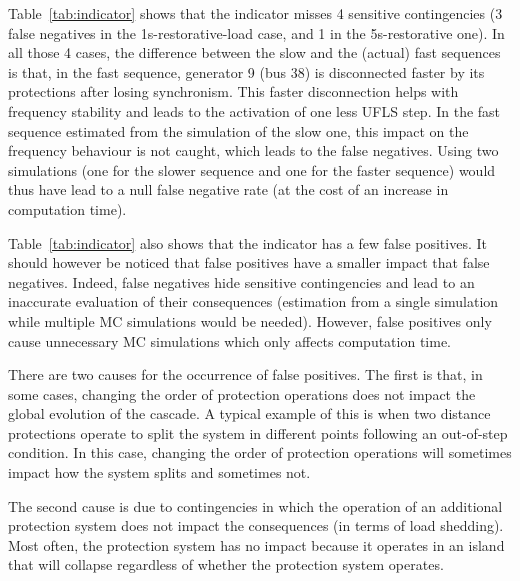 

Table~\ref{tab:indicator} shows that the indicator misses 4 sensitive contingencies (3 false negatives in the 1s-restorative-load case, and 1 in the 5s-restorative one). In all those 4 cases, the difference between the slow and the (actual) fast sequences is that, in the fast sequence, generator 9 (bus 38) is disconnected faster by its protections after losing synchronism. This faster disconnection helps with frequency stability and leads to the activation of one less UFLS step. In the fast sequence estimated from the simulation of the slow one, this impact on the frequency behaviour is not caught, which leads to the false negatives. Using two simulations (one for the slower sequence and one for the faster sequence) would thus have lead to a null false negative rate (at the cost of an increase in computation time).

Table~\ref{tab:indicator} also shows that the indicator has a few false positives. It should however be noticed that false positives have a smaller impact that false negatives. Indeed, false negatives hide sensitive contingencies and lead to an inaccurate evaluation of their consequences (estimation from a single simulation while multiple MC simulations would be needed). However, false positives only cause unnecessary MC simulations which only affects computation time.

There are two causes for the occurrence of false positives. The first is that, in some cases, changing the order of protection operations does not impact the global evolution of the cascade. A typical example of this is when two distance protections operate to split the system in different points following an out-of-step condition. In this case, changing the order of protection operations will sometimes impact how the system splits and sometimes not.

The second cause is due to contingencies in which the operation of an additional protection system does not impact the consequences (in terms of load shedding). Most often, the protection system has no impact because it operates in an island that will collapse regardless of whether the protection system operates. %


